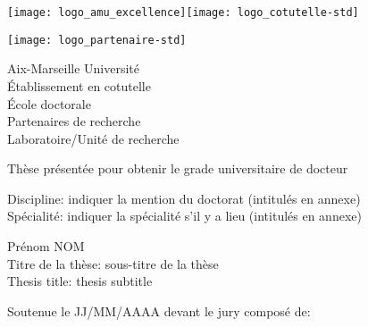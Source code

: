 {\selectfont
\vspace*{-2cm}
\begin{center}
	\begin{minipage}[c]{0.70\linewidth}
		\raggedright\texttt{[image: logo\_amu\_excellence]}\quad\texttt{[image: logo\_cotutelle-std]}
	\end{minipage}\hfill
	\begin{minipage}[c]{0.30\linewidth}
		\raggedleft\texttt{[image: logo\_partenaire-std]}
	\end{minipage}\hfill
\end{center}
\begin{flushleft}
	\vspace{0.2cm}
	\LARGE Aix-Marseille Université\\
	\LARGE\textcolor{black!50}{Établissement en cotutelle}\\
	\Large École doctorale\\
	\vspace{0.2cm}
	\normalsize\textcolor{black!50}{Partenaires de recherche}\\
	\vspace{0.2cm}
	Laboratoire/Unité de recherche\\
    \begin{center}
		\vspace{1.8cm}
		Thèse présentée pour obtenir le grade universitaire de docteur\\
    \end{center}
	\vspace{0.5cm}
    Discipline: indiquer la mention du doctorat (intitulés en annexe)\\
    Spécialité: indiquer la spécialité s'il y a lieu (intitulés en annexe)\\
    \begin{center}
        \vspace{0.5cm}
        \Large Prénom NOM\\
        \vspace{1cm}
				\large Titre de la thèse: sous-titre de la thèse\\
				\vspace{0.5cm}
				\normalsize Thesis title: thesis subtitle\\
    \end{center}
	\vspace{3.4cm}
    \normalsize Soutenue le JJ/MM/AAAA devant le jury composé de:\\

\end{flushleft}}
